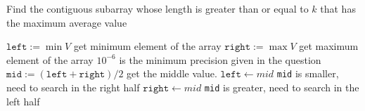 \documentclass[a4paper,12pt]{article}
\begin{document}
\begin{algorithm}[H]
\caption{Find the contiguous subarray whose length is greater than or equal to $k$ that has the maximum average value}
\begin{algorithmic}
\Statex
{}
\State $\mathtt{left} := \min{V}$ \Comment get minimum element of the array
\State $\mathtt{right} := \max{V}$ \Comment get maximum element of the array
 \Comment $10^{-6}$ is the minimum precision given in the question
\State $\mathtt{mid} := (\mathtt{left} + \mathtt{right})/2$ \Comment get the middle value.
\State $\mathtt{left} \gets mid$  \Comment \texttt{mid} is smaller, need to search in the right half
\Else
\State $\mathtt{right} \gets mid$ \Comment \texttt{mid} is greater, need to search in the left half
\EndIf
\EndWhile
\EndProcedure
\Statex
\end{algorithmic}
\end{algorithm}
\end{document}
